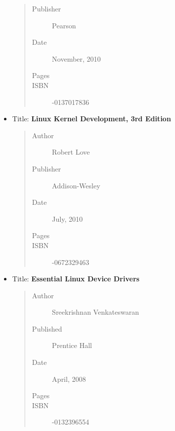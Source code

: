 \documentclass[a4paper,8pt,english]{sphinxmanual}
\begin{document}
\begin{itemize}
\begin{quote}
\begin{description}
\item[{Publisher}] \leavevmode
Pearson

\item[{Date}] \leavevmode
November, 2010

\item[{Pages}] 

\item[{ISBN}] -0137017836

\end{description}\end{quote}

\item {} 
Title: \textbf{Linux Kernel Development, 3rd Edition}
\begin{quote}\begin{description}
\item[{Author}] \leavevmode
Robert Love

\item[{Publisher}] \leavevmode
Addison-Wesley

\item[{Date}] \leavevmode
July, 2010

\item[{Pages}] 

\item[{ISBN}] -0672329463

\end{description}\end{quote}

\item {} 
Title: \textbf{Essential Linux Device Drivers}
\begin{quote}\begin{description}
\item[{Author}] \leavevmode
Sreekrishnan Venkateswaran

\item[{Published}] \leavevmode
Prentice Hall

\item[{Date}] \leavevmode
April, 2008

\item[{Pages}] 

\item[{ISBN}] -0132396554

\end{description}\end{quote}

\end{itemize}
\end{document}
